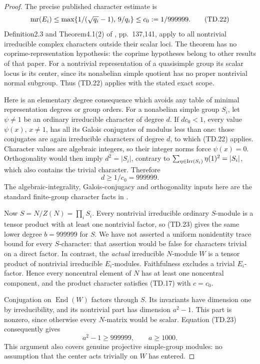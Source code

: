 \begin{proof}
The precise published character estimate is
\[
 {\rm mr}(E_i)\le
       \max\{1/(\sqrt{q_i}-1),\,9/q_i\}
       \le c_0:=1/999999 .
       \tag{TD.22}
\]
Definition2.3 and Theorem4.1(2) of \cite{BI:DHP}, pp.~137,141,
apply to all nontrivial irreducible complex characters outside
their scalar loci.  The theorem has no coprime-representation
hypothesis: the coprime hypotheses belong to other results of
that paper.  For a nontrivial representation of a quasisimple
group its scalar locus is its center, since its nonabelian simple
quotient has no proper nontrivial normal subgroup.
Thus (TD.22) applies with the stated exact scope.

Here is an elementary degree consequence which avoids any table
of minimal representation degrees or group orders.
For a nonabelian simple group \(S_i\), let \(\psi\ne1\) be an
ordinary irreducible character of degree \(d\).
If \(dc_0<1\), every value \(\psi(x)\), \(x\ne1\), has all its
Galois conjugates of modulus less than one: those conjugates are
again irreducible characters of degree \(d\), to which (TD.22)
applies.  Character values are algebraic integers, so their
integer norms force \(\psi(x)=0\).
Orthogonality would then imply \(d^2=|S_i|\), contrary to
\(\sum_{\eta\in{\rm Irr}(S_i)}\eta(1)^2=|S_i|\), which also
contains the trivial character.  Therefore
\[
                              d\ge1/c_0=999999 .
                              \tag{TD.23}
\]
The algebraic-integrality, Galois-conjugacy and orthogonality
inputs here are the standard finite-group character facts in
\cite[\S\S2.3--2.4,6.4--6.5,12.1]{OG:Serre1977}.

Now \(S=N/Z(N)=\prod_iS_i\).
Every nontrivial irreducible ordinary \(S\)-module is a tensor
product with at least one nontrivial factor, so (TD.23) gives
the same lower degree \(b=999999\) for \(S\).
We have not asserted a uniform nonidentity trace bound for every
\(S\)-character: that assertion would be false for characters
trivial on a direct factor.
In contrast, the \emph{actual} irreducible \(N\)-module \(W\)
is a tensor product of nontrivial irreducible \(E_i\)-modules.
Faithfulness excludes a trivial \(E_i\)-factor.  Hence every
noncentral element of \(N\) has at least one noncentral component,
and the product character satisfies (TD.17) with \(c=c_0\).

Conjugation on \(\operatorname{End}(W)\) factors through \(S\).
Its invariants have dimension one by irreducibility, and its
nontrivial part has dimension \(a^2-1\).
This part is nonzero, since otherwise every \(N\)-matrix would
be scalar.  Equation (TD.23) consequently gives
\[
                         a^2-1\ge999999,\qquad a\ge1000 .
                         \tag{TD.24}
\]
This argument also covers genuine projective simple-group modules:
no assumption that the center acts trivially on \(W\) has entered.


\end{proof}
